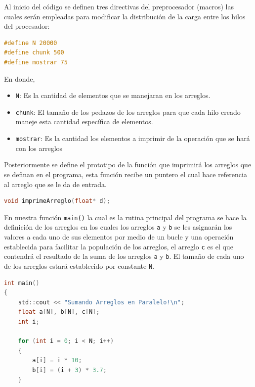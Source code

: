 \documentclass[12pt,a4paper]{article}
\begin{document}
\vspace{1em}

Al inicio del código se definen tres directivas del preprocesador (macros) las cuales serán empleadas para modificar la distribución de la carga entre los hilos del procesador:

\begin{lstlisting}[language=C, numbers=none]
#define N 20000
#define chunk 500
#define mostrar 75
\end{lstlisting}
En donde,
\begin{itemize}
    \item \texttt{N}: Es la cantidad de elementos que se manejaran en los arreglos.
    \item \texttt{chunk}: El tamaño de los pedazos de los arreglos para que cada hilo creado maneje esta cantidad específica de elementos.
    \item \texttt{mostrar}: Es la cantidad los elementos a imprimir de la operación que se hará con los arreglos
\end{itemize}

Posteriormente se define el prototipo de la función que imprimirá los arreglos que se definan en el programa, esta función recibe un puntero el cual hace referencia al arreglo que se le da de entrada.

\begin{lstlisting}[language=C, numbers=none]
void imprimeArreglo(float* d);
\end{lstlisting}

\vspace{1em}

En nuestra función \texttt{main()} la cual es la rutina principal del programa se hace la definición de los arreglos en los cuales los arreglos \texttt{a} y \texttt{b} se les asignarán los valores a cada uno de sus elementos por medio de un bucle y una operación establecida para facilitar la populación de los arreglos, el arreglo \texttt{c} es el que contendrá el resultado de la suma de los arreglos \texttt{a} y \texttt{b}. El tamaño de cada uno de los arreglos estará establecido por constante \texttt{N}.

\begin{lstlisting}[language=C, numbers=none]
int main()
{
    std::cout << "Sumando Arreglos en Paralelo!\n";
    float a[N], b[N], c[N];
    int i;

    for (int i = 0; i < N; i++)
    {
        a[i] = i * 10;
        b[i] = (i + 3) * 3.7;
    }
\end{lstlisting}
\end{document}
